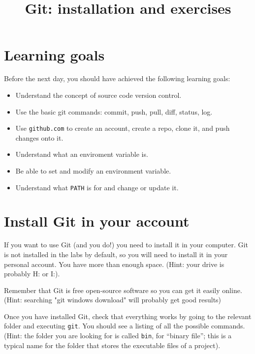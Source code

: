 \documentclass{article}
\title{Git: installation and exercises}
\date{}
\begin{document}
\maketitle

\vspace{1cm}

\section*{Learning goals}
\label{sec:learning-goals}

Before the next day, you should have achieved the following learning
goals: 

\begin{itemize}
\item Understand the concept of source code version control.
\item Use the basic git commands: commit, push, pull, diff, status, log.
\item Use \verb+github.com+ to create an account, create a repo, clone
  it, and push changes onto it. 
\item Understand what an enviroment variable is.
\item Be able to set and modify an environment variable.
\item Understand what \verb+PATH+ is for and change or update it.
\end{itemize}

\section{Install Git in your account}
\label{sec:install-git-your}

If you want to use Git (and you do!) you need to install it in your
computer. Git is not installed in the labs by default, so you will
need to install it in your personal account. You have more than enough
space. (Hint: your drive is probably H: or I:).

Remember that Git is free open-source software so you can get it
easily online. (Hint: searching "git windows download" will
probably get good results)

Once you have installed Git, check that everything works by going to
the relevant folder and executing \verb+git+. You should see a listing
of all the possible commands. (Hint: the folder you are looking for is
called \verb+bin+, for ``binary file''; this is a typical name for the
folder that stores the executable files of a project). 
\end{document}
